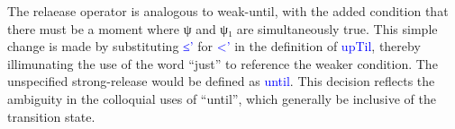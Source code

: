 \documentclass{article}
\newcommand{\blue}[1]{\textcolor{blue}{#1}}
\begin{document}
The relaease operator is analogous to weak-until, with the added condition that
there must be a moment where ψ and ψ₁ are simultaneously true. This simple
change is made by substituting \blue{≤'} for \blue{<'} in the definition of
\blue{upTil}, thereby illimunating the use of the word ``just'' to reference the
weaker condition. The unspecified strong-release would be defined as
\blue{until}. This decision reflects the ambiguity in the colloquial uses of
``until'', which generally be inclusive of the transition state.

\begin{code}%
%
\>[4]\AgdaSpace{}%
\AgdaSymbol{:}\AgdaSpace{}%
\AgdaSpace{}%
\AgdaSpace{}%
\AgdaSpace{}%
\AgdaSpace{}%
\AgdaSpace{}%
\AgdaSpace{}%
\<%
\\
%
\>[4]\AgdaSpace{}%
\AgdaSpace{}%
\AgdaSpace{}%
\AgdaSpace{}%
\AgdaSymbol{=}\AgdaSpace{}%
\AgdaSpace{}%
\AgdaSymbol{(}\AgdaSpace{}%
\AgdaSymbol{:}\AgdaSpace{}%
\AgdaSymbol{)}\AgdaSpace{}%
\AgdaSpace{}%
\AgdaSpace{}%
\AgdaSpace{}%
\AgdaSpace{}%
\AgdaSpace{}%
\AgdaSymbol{(}\AgdaSpace{}%
\AgdaSpace{}%
\AgdaSymbol{)}\AgdaSpace{}%
\AgdaSpace{}%
\<%
\\
%
\\[\AgdaEmptyExtraSkip]%
%
\>[4]\AgdaSpace{}%
\AgdaSymbol{:}\AgdaSpace{}%
\AgdaSpace{}%
\AgdaSpace{}%
\AgdaSpace{}%
\AgdaSpace{}%
\AgdaSpace{}%
\AgdaSpace{}%
\<%
\\
%
\>[4]\AgdaSpace{}%
\AgdaSpace{}%
\AgdaSpace{}%
\AgdaSpace{}%
\AgdaSymbol{=}\AgdaSpace{}%
\AgdaFunction{Σ[}\AgdaSpace{}%
\AgdaSpace{}%
\AgdaSpace{}%
\AgdaSpace{}%
\AgdaFunction{]}\AgdaSpace{}%
\AgdaSymbol{(}\AgdaSpace{}%
\AgdaSpace{}%
\AgdaSymbol{)}\AgdaSpace{}%
\AgdaSpace{}%
\AgdaSpace{}%
\AgdaSpace{}%
\AgdaSpace{}%
\AgdaSpace{}%
\AgdaSpace{}%
\<%
\end{code}
\end{document}
